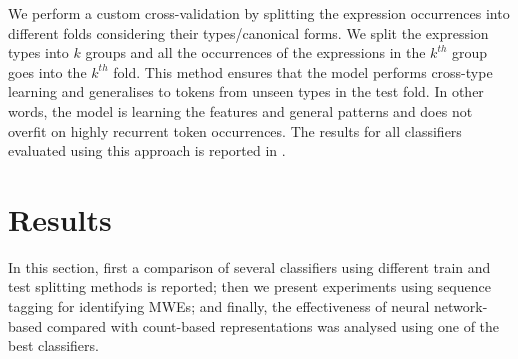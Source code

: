 \documentclass[output=paper
,modfonts
,nonflat]{langsci/langscibook}
\begin{document}
We perform a custom cross-validation by splitting the expression occurrences into different folds considering their types/canonical forms. We split the expression types into $k$ groups and all the occurrences of the expressions in the $k^{th}$ group goes into the $k^{th}$ fold. 
This method ensures that the model performs cross-type learning and generalises to tokens from unseen types in the test fold. In other words, the model is learning the features and general patterns and does not overfit on highly recurrent token occurrences.
The results for all classifiers evaluated using this approach is reported in .


\section{Results}

In this section, first a comparison of several classifiers using different train and test splitting methods is reported; then we present experiments using sequence tagging for identifying MWEs; and finally, the effectiveness of neural network-based  compared with count-based representations was analysed using one of the best classifiers.
\end{document}
